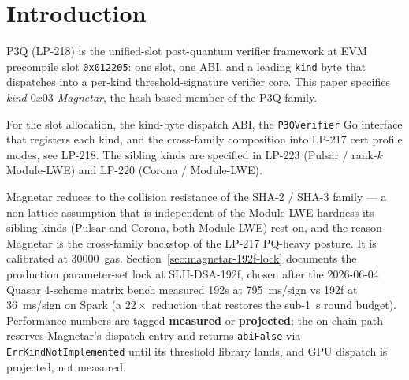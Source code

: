 \section{Introduction}

P3Q (LP-218) is the unified-slot post-quantum verifier framework at
EVM precompile slot \texttt{0x012205}: one slot, one ABI, and a
leading \texttt{kind} byte that dispatches into a per-kind
threshold-signature verifier core. This paper specifies
\emph{kind $0x03$ Magnetar}, the hash-based member of the P3Q family.

For the slot allocation, the kind-byte dispatch ABI, the
\texttt{P3QVerifier} Go interface that registers each kind, and the
cross-family composition into LP-217 cert profile modes, see LP-218.
The sibling kinds are specified in LP-223 (Pulsar / rank-$k$
Module-LWE) and LP-220 (Corona / Module-LWE).

Magnetar reduces to the collision resistance of the SHA-2 / SHA-3
family --- a non-lattice assumption that is independent of the
Module-LWE hardness its sibling kinds (Pulsar and Corona, both
Module-LWE) rest on, and the reason Magnetar is the cross-family
backstop of the LP-217 PQ-heavy posture. It is calibrated at \SI{30000}{gas}. Section~\ref{sec:magnetar-192f-lock}
documents the production parameter-set lock at SLH-DSA-192f, chosen
after the 2026-06-04 Quasar 4-scheme matrix bench measured 192s at
\SI{795}{ms}/sign vs 192f at \SI{36}{ms}/sign on Spark (a
$22\times$ reduction that restores the sub-\SI{1}{s} round budget).
Performance numbers are tagged \textbf{measured} or
\textbf{projected}; the on-chain path reserves Magnetar's dispatch
entry and returns \texttt{abiFalse} via
\texttt{ErrKindNotImplemented} until its threshold library lands,
and GPU dispatch is projected, not measured.
